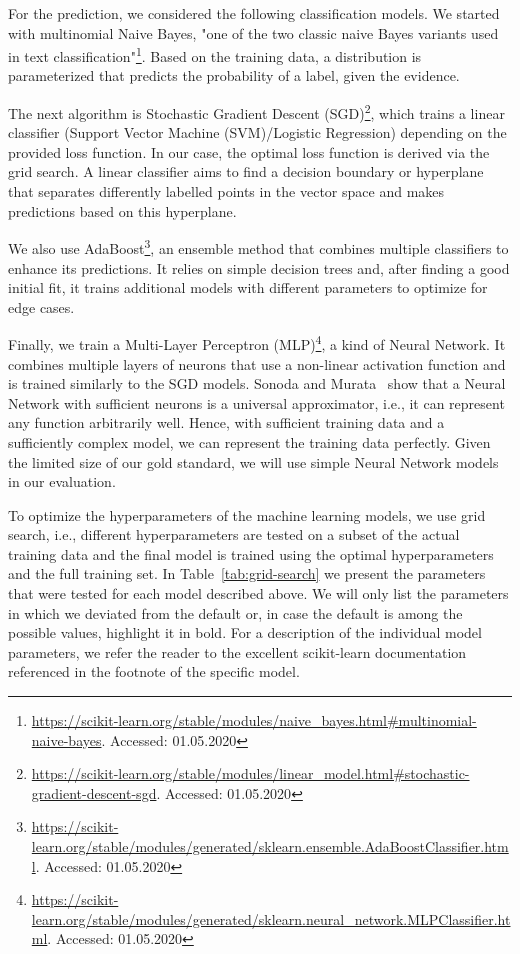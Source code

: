 For the prediction, we considered the following classification models.
We started with multinomial Naive Bayes, "one of the two classic naive Bayes variants used in text
classification"\footnote{\url{https://scikit-learn.org/stable/modules/naive_bayes.html#multinomial-naive-bayes}. Accessed: 01.05.2020}.
Based on the training data, a distribution is parameterized that predicts the probability of a label, given the
evidence.

The next algorithm is Stochastic Gradient Descent (SGD)\footnote{\url{https://scikit-learn.org/stable/modules/linear_model.html#stochastic-gradient-descent-sgd}. Accessed: 01.05.2020},
which trains a linear classifier (Support Vector Machine (SVM)/Logistic Regression) depending on the provided loss function.
In our case, the optimal loss function is derived via the grid search.
A linear classifier aims to find a decision boundary or hyperplane that separates differently labelled points in the
vector space and makes predictions based on this hyperplane.

We also use AdaBoost\footnote{\url{https://scikit-learn.org/stable/modules/generated/sklearn.ensemble.AdaBoostClassifier.html}. Accessed: 01.05.2020},
an ensemble method that combines multiple classifiers to enhance its predictions.
It relies on simple decision trees and, after finding a good initial fit, it trains additional models with different
parameters to optimize for edge cases.

Finally, we train a Multi-Layer Perceptron (MLP)\footnote{\url{https://scikit-learn.org/stable/modules/generated/sklearn.neural_network.MLPClassifier.html}. Accessed: 01.05.2020},
a kind of Neural Network.
It combines multiple layers of neurons that use a non-linear activation function and is trained similarly to the SGD
models.
Sonoda and Murata~\cite{sonoda2017neural} show that a Neural Network with sufficient neurons is a universal approximator,
i.e., it can represent any function arbitrarily well.
Hence, with sufficient training data and a sufficiently complex model, we can represent the training data perfectly.
Given the limited size of our gold standard, we will use simple Neural Network models in our evaluation.

To optimize the hyperparameters of the machine learning models, we use grid search, i.e., different hyperparameters
are tested on a subset of the actual training data and the final model is trained using the optimal hyperparameters and
the full training set.
In Table~\ref{tab:grid-search} we present the parameters that were tested for each model described above.
We will only list the parameters in which we deviated from the default or, in case the default is among the possible values,
highlight it in bold.
For a description of the individual model parameters, we refer the reader to the excellent scikit-learn documentation
referenced in the footnote of the specific model.


